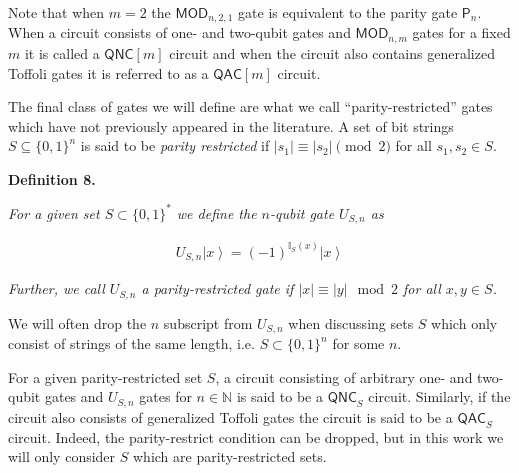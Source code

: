 \documentclass[10pt,a4paper]{article}
\begin{document}



Note that when $m=2$ the $\mathsf{MOD}_{n,2,1}$ gate is equivalent to the parity gate $\mathsf{P}_{n}$. When a circuit consists of one- and two-qubit gates and $\mathsf{MOD}_{n,m}$ gates for a fixed $m$ it is called a ${\mathsf{QNC}}[m]$ circuit and when the circuit also contains generalized Toffoli gates it is referred to as a ${\mathsf{QAC}}[m]$ circuit.\par




The final class of gates we will define are what we call “parity-restricted” gates which have not previously appeared in the literature. A set of bit strings $S\subseteq\{0,1\}^{n}$ is said to be \emph{parity restricted} if $|s_{1}|\equiv|s_{2}|\pmod{2}$ for all $s_{1},s_{2}\in S$.\par





\par\medskip\noindent\textbf{
\textbf{Definition 8}\textbf{.}
}\par



\emph{For a given set $S\subset\{0,1\}^{*}$ we define the $n$-qubit gate $U_{S,n}$ as}\par


\[\begin{gathered}
\displaystyle U_{S,n}\left|x\right\rangle=(-1)^{\mathbb{I}_{S}(x)}\left|x\right\rangle
\end{gathered}\]


\emph{Further, we call $U_{S,n}$ a parity-restricted gate if $|x|\equiv|y|\mod{2}$ for all $x,y\in S$.}\par






We will often drop the $n$ subscript from $U_{S,n}$ when discussing sets $S$ which only consist of strings of the same length, i.e. $S\subset\{0,1\}^{n}$ for some $n$.\par




For a given parity-restricted set $S$, a circuit consisting of arbitrary one- and two-qubit gates and $U_{S,n}$ gates for $n\in\mathbb{N}$ is said to be a ${\mathsf{QNC}}_{S}$ circuit. Similarly, if the circuit also consists of generalized Toffoli gates the circuit is said to be a ${\mathsf{QAC}}_{S}$ circuit. Indeed, the parity-restrict condition can be dropped, but in this work we will only consider $S$ which are parity-restricted sets.\par
\end{document}
